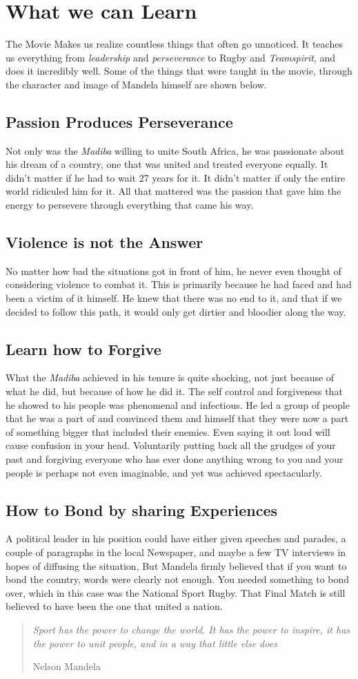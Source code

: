 \documentclass[11pt]{article}
\begin{document}
\section{What we can Learn}
The Movie Makes us realize countless things that often go
unnoticed. It teaches us everything from \textit{leadership} and
\textit{perseverance} to Rugby and \textit{Teamspirit}, and does it incredibly
well. Some of the things that were taught in the movie, through
the character and image of Mandela himself are shown below. 
\subsection{Passion Produces Perseverance}
Not only was the \textit{Madiba}
willing to unite South Africa,
he was passionate about his
dream of a country, one that
was united and treated
everyone equally. It didn’t
matter if he had to wait 27
years for it. It didn’t matter if
only the entire world ridiculed
him for it. All that mattered
was the passion that gave him
the energy to persevere
through everything that came
his way.
\subsection{Violence is not the Answer}
No matter how bad the
situations got in front of him, he
never even thought of
considering violence to combat
it. This is primarily because he
had faced and had been a victim
of it himself. He knew that there
was no end to it, and that if we
decided to follow this path, it
would only get dirtier and
bloodier along the way.
\subsection{Learn how to Forgive}
What the \textit{Madiba} achieved in his tenure is quite shocking, not just
because of what he did, but because of how he did it. The self control and
forgiveness that he showed to his people was phenomenal and
infectious. He led a group of people that he was a part of and convinced
them and himself that they were now a part of something bigger that
included their enemies. Even saying it out loud will cause confusion in
your head. Voluntarily putting back all the grudges of your past and
forgiving everyone who has ever done anything wrong to you and your
people is perhaps not even imaginable, and yet was achieved
spectacularly.
\subsection{How to Bond by sharing Experiences}
A political leader in his position could have either given speeches and
parades, a couple of paragraphs in the local Newspaper, and maybe a few
TV interviews in hopes of diffusing the situation, But Mandela firmly
believed that if you want to bond the country, words were clearly not
enough. You needed something to bond over, which in this case was the
National Sport Rugby. That Final Match is still believed to have been the
one that united a nation.\\

\begin{quotation}
	\textit{Sport has the power to change the world. It has the power to inspire, it has the power to unit people, and in a way that little else does}\\
	\begin{flushright}
		Nelson Mandela
	\end{flushright}
\end{quotation}


	
\end{document}
